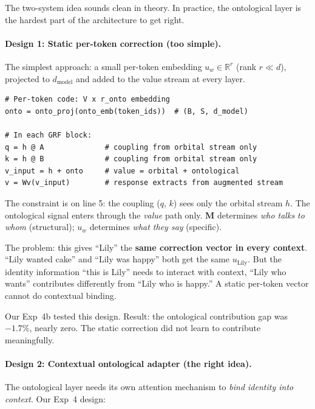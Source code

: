\documentclass[11pt, a4paper]{article}
\newcommand{\M}{\mathbf{M}}
\newcommand{\R}{\mathbb{R}}
\theoremstyle{remark}
\begin{document}
The two-system idea sounds clean in theory.
In practice, the ontological layer is the hardest part of the architecture to get right.

\paragraph{Design 1: Static per-token correction (too simple).}
The simplest approach: a small per-token embedding $u_w \in \R^{r}$ (rank $r \ll d$), projected to $d_{\text{model}}$ and added to the value stream at every layer.

\begin{lstlisting}[caption={Static ontological correction (Exp 4b)}]
# Per-token code: V x r_onto embedding
onto = onto_proj(onto_emb(token_ids))  # (B, S, d_model)

# In each GRF block:
q = h @ A              # coupling from orbital stream only
k = h @ B              # coupling from orbital stream only
v_input = h + onto     # value = orbital + ontological
v = Wv(v_input)        # response extracts from augmented stream
\end{lstlisting}

\noindent
The constraint is on line 5: the coupling ($q$, $k$) sees only the orbital stream $h$.
The ontological signal enters through the \emph{value} path only.
$\M$ determines \emph{who talks to whom} (structural); $u_w$ determines \emph{what they say} (specific).

The problem: this gives ``Lily'' the \textbf{same correction vector in every context}.
``Lily wanted cake'' and ``Lily was happy'' both get the same $u_{\text{Lily}}$.
But the identity information ``this is Lily'' needs to interact with context, ``Lily who wants'' contributes differently from ``Lily who is happy.''
A static per-token vector cannot do contextual binding.

Our Exp~4b tested this design.
Result: the ontological contribution gap was $-1.7\%$, nearly zero.
The static correction did not learn to contribute meaningfully.

\paragraph{Design 2: Contextual ontological adapter (the right idea).}
The ontological layer needs its own attention mechanism to \emph{bind identity into context}.
Our Exp~4 design:
\end{document}
